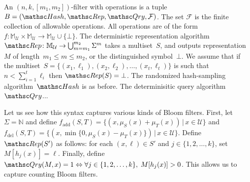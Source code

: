An $(n,k,[m_1,m_2])$-filter with operations is a tuple  $B=(\Hash,\Rep,\Qry, \mathcal{F})$.  
The set $\mathcal{F}$ is the finite collection of allowable operations.  All operations are of the form 
$f: \mathbb{M}_{\mathcal{U}} \times \mathbb{M}_{\mathcal{U}} \rightarrow \mathbb{M}_{\mathcal{U}} \cup \{\bot\}$.  
%
The deterministic representation algorithm $\Rep\colon \mathbb{M}_\mathcal{U} \rightarrow \bigcup_{m=m_1}^{m_2}\Sigma^m$ takes a multiset~$S$, and outputs representation~$M$ of length~$m_1 \leq m \leq m_2$, or the distinguished symbol~$\bot$.  We assume that if the multiset~$S=\{(x_1,\ell_1),(x_2,\ell_2),\ldots,(x_t,\ell_t)\}$ is such that $n < \sum_{i=1}^t \ell_i$ then $\Rep(S)=\bot$.
%
The randomized hash-sampling algorithm~$\Hash$ is as before.
%
The determinisitic query algorithm $\Qry$... 


Let us see how this syntax captures various kinds of Bloom filters.  First, let $\Sigma = \mathbb{N}$ and define $f_{\mathrm{add}}(S,T)=\{(x,\mu_S(x)+\mu_T(x)) \,|\, x \in \mathcal{U}\}$ and $f_\mathrm{del}(S,T) = \{(x,\min\{0,\mu_S(x)-\mu_T(x)\}) \,|\, x \in \mathcal{U} \}$.  Define $\Rep(S')$ as follows: for each $(x,\ell)\in S'$ and $j\in\{1,2,\ldots,k\}$, set $M[h_j(x)]=\ell$.   Finally, define $\Qry(M,x) = 1 \Leftrightarrow \forall j \in \{1,2,\ldots,k\},\; M[h_j(x)] > 0$.  This allows us to capture counting Bloom filters. 

\fi